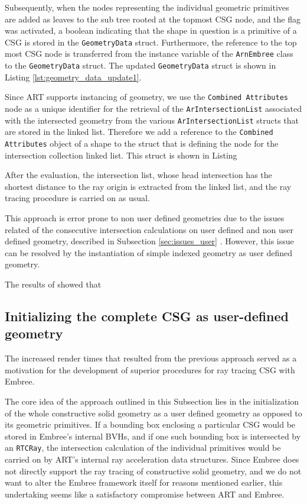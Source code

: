 Subsequently, when the nodes representing the individual geometric primitives are added as leaves to the sub tree rooted at the topmost CSG node, and the flag was activated, a boolean indicating that the shape in question is a primitive of a CSG is stored in the \texttt{GeometryData} struct. Furthermore, the reference to the top most CSG node is transferred from the instance variable of the \texttt{ArnEmbree} class to the \texttt{GeometryData} struct. The updated \texttt{GeometryData} struct is shown in Listing \ref{lst:geometry_data_update1}.


Since ART supports instancing of geometry, we use the \texttt{Combined Attributes} node as a unique identifier for the retrieval of the \texttt{ArIntersectionList} associated with the intersected geometry from the various \texttt{ArIntersectionList} structs that are stored in the linked list.
Therefore we add a reference to the \texttt{Combined Attributes} object of a shape to the struct that is defining the node for the intersection collection linked list. This struct is shown in Listing 

After the evaluation, the intersection list, whose head intersection has the shortest distance to the ray origin is extracted from the linked list, and the ray tracing procedure is carried on as usual.

This approach is error prone to non user defined geometries due to the issues related of the consecutive intersection calculations on user defined and non user defined geometry, described in Subsection \ref{sec:issues_user} . However, this issue can be resolved by the instantiation of simple indexed geometry as user defined geometry.

The results of \cite{karaffova2016} showed that


\subsection{Initializing the complete CSG as user-defined geometry}
\label{subsec:apprach2}

The increased render times that resulted from the previous approach served as a motivation for the development of superior procedures for ray tracing CSG with Embree. 

The core idea of the approach outlined in this Subsection lies in the initialization of the whole constructive solid geometry as a user defined geometry as opposed to its geometric primitives. If a bounding box enclosing a particular CSG would be stored in Embree's internal BVHs, and if one such bounding box is intersected by an \texttt{RTCRay}, the intersection calculation of the individual primitives would be carried on by ART's internal ray acceleration data structures. Since Embree does not directly support the ray tracing of constructive solid geometry, and we do not want to alter the Embree framework itself for reasons mentioned earlier, this undertaking seems like a satisfactory compromise between ART and Embree.

